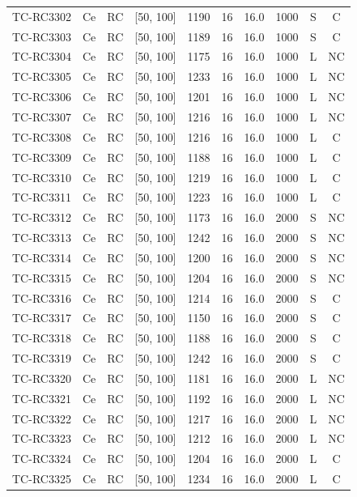 \begin{longtable}{lccccccccc}
TC-RC3302 & Ce & RC & [50, 100] & 1190 & 16 & 16.0 & 1000 & S & C \\
TC-RC3303 & Ce & RC & [50, 100] & 1189 & 16 & 16.0 & 1000 & S & C \\
TC-RC3304 & Ce & RC & [50, 100] & 1175 & 16 & 16.0 & 1000 & L & NC \\
TC-RC3305 & Ce & RC & [50, 100] & 1233 & 16 & 16.0 & 1000 & L & NC \\
TC-RC3306 & Ce & RC & [50, 100] & 1201 & 16 & 16.0 & 1000 & L & NC \\
TC-RC3307 & Ce & RC & [50, 100] & 1216 & 16 & 16.0 & 1000 & L & NC \\
TC-RC3308 & Ce & RC & [50, 100] & 1216 & 16 & 16.0 & 1000 & L & C \\
TC-RC3309 & Ce & RC & [50, 100] & 1188 & 16 & 16.0 & 1000 & L & C \\
TC-RC3310 & Ce & RC & [50, 100] & 1219 & 16 & 16.0 & 1000 & L & C \\
TC-RC3311 & Ce & RC & [50, 100] & 1223 & 16 & 16.0 & 1000 & L & C \\
TC-RC3312 & Ce & RC & [50, 100] & 1173 & 16 & 16.0 & 2000 & S & NC \\
TC-RC3313 & Ce & RC & [50, 100] & 1242 & 16 & 16.0 & 2000 & S & NC \\
TC-RC3314 & Ce & RC & [50, 100] & 1200 & 16 & 16.0 & 2000 & S & NC \\
TC-RC3315 & Ce & RC & [50, 100] & 1204 & 16 & 16.0 & 2000 & S & NC \\
TC-RC3316 & Ce & RC & [50, 100] & 1214 & 16 & 16.0 & 2000 & S & C \\
TC-RC3317 & Ce & RC & [50, 100] & 1150 & 16 & 16.0 & 2000 & S & C \\
TC-RC3318 & Ce & RC & [50, 100] & 1188 & 16 & 16.0 & 2000 & S & C \\
TC-RC3319 & Ce & RC & [50, 100] & 1242 & 16 & 16.0 & 2000 & S & C \\
TC-RC3320 & Ce & RC & [50, 100] & 1181 & 16 & 16.0 & 2000 & L & NC \\
TC-RC3321 & Ce & RC & [50, 100] & 1192 & 16 & 16.0 & 2000 & L & NC \\
TC-RC3322 & Ce & RC & [50, 100] & 1217 & 16 & 16.0 & 2000 & L & NC \\
TC-RC3323 & Ce & RC & [50, 100] & 1212 & 16 & 16.0 & 2000 & L & NC \\
TC-RC3324 & Ce & RC & [50, 100] & 1204 & 16 & 16.0 & 2000 & L & C \\
TC-RC3325 & Ce & RC & [50, 100] & 1234 & 16 & 16.0 & 2000 & L & C \\

\end{longtable}
